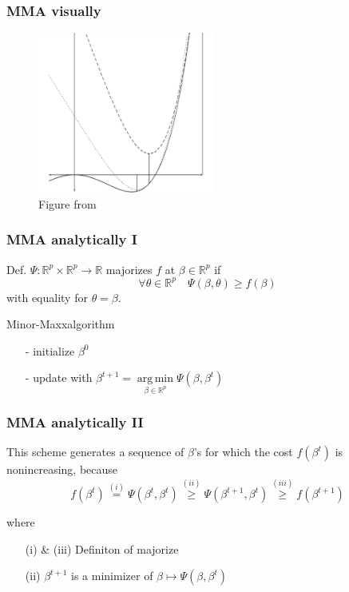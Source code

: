 \documentclass{beamer}
\newcommand{\R}{\mathbb{R}}
\DeclareMathOperator*{\argmin}{arg\,min}
\begin{document}
\begin{frame}
\frametitle{MMA visually}
\begin{figure}
\includegraphics[height=150pt]{img/minmaxalgo2.png}
\caption{Figure from \cite{DL15}}
\end{figure}

\end{frame}

\begin{frame}
\frametitle{MMA analytically I}
Def. 
$\Psi:\R^p\times\R^p\to\R$ {\color{blue}majorizes} $f$ at $\beta\in\R^p$ if \[\forall\theta\in\R^p\quad \Psi(\beta,\theta)\ge f(\beta)\]
with equality for $\theta=\beta$.
\vspace{10pt}

Minor-Maxxalgorithm
\begin{itemize}
\item[-] initialize $\beta^0$
\item[-] update with $\beta^{t+1}=\argmin\limits_{\beta\in\R^p}\Psi(\beta,\beta^t)$
\end{itemize}
\end{frame}

\begin{frame}
\frametitle{MMA analytically II}
This scheme generates a sequence of $\beta$'s for which the cost $f(\beta^t)$ is nonincreasing, because
\[f(\beta^t)\stackrel{(i)}{=}\Psi(\beta^t,\beta^t)\stackrel{(ii)}{\ge}\Psi(\beta^{t+1},\beta^t)\stackrel{(iii)}{\ge} f(\beta^{t+1})\]

where 
\begin{itemize}
\setlength{\itemindent}{20pt}
\item[(i) \& (iii)] Definiton of majorize
\item[(ii)] $\beta^{t+1}$ is a minimizer of $\beta\mapsto\Psi(\beta,\beta^t)$
\end{itemize}
\end{frame}

\end{document}
